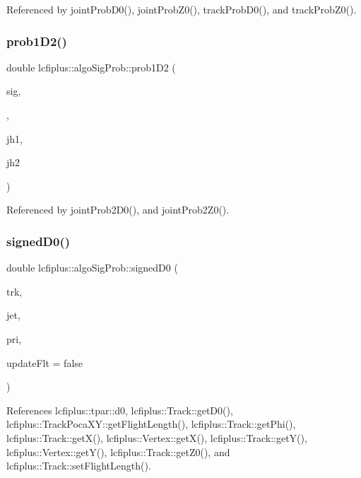 Referenced by joint\+Prob\+D0(), joint\+Prob\+Z0(), track\+Prob\+D0(), and track\+Prob\+Z0().

\mbox{\label{namespacelcfiplus_1_1algoSigProb_a607d8c6a50bd4e79540d9af10041b870}} 
\subsubsection{prob1\+D2()}
{\footnotesize\ttfamily double lcfiplus\+::algo\+Sig\+Prob\+::prob1\+D2 (\begin{DoxyParamCaption}\item[{double}]{sig,  }\item[{double}]{,  }\item[{const T\+H1 $\ast$}]{jh1,  }\item[{const T\+H1 $\ast$}]{jh2 }\end{DoxyParamCaption})}



Referenced by joint\+Prob2\+D0(), and joint\+Prob2\+Z0().

\mbox{\label{namespacelcfiplus_1_1algoSigProb_a69330faef3e18bdd94f5022a49526437}} 
\subsubsection{signed\+D0()}
{\footnotesize\ttfamily double lcfiplus\+::algo\+Sig\+Prob\+::signed\+D0 (\begin{DoxyParamCaption}\item[{const \textbf{ Track} $\ast$}]{trk,  }\item[{const \textbf{ Jet} $\ast$}]{jet,  }\item[{const \textbf{ Vertex} $\ast$}]{pri,  }\item[{bool}]{update\+Flt = {\ttfamily false} }\end{DoxyParamCaption})}



References lcfiplus\+::tpar\+::d0, lcfiplus\+::\+Track\+::get\+D0(), lcfiplus\+::\+Track\+Poca\+X\+Y\+::get\+Flight\+Length(), lcfiplus\+::\+Track\+::get\+Phi(), lcfiplus\+::\+Track\+::get\+X(), lcfiplus\+::\+Vertex\+::get\+X(), lcfiplus\+::\+Track\+::get\+Y(), lcfiplus\+::\+Vertex\+::get\+Y(), lcfiplus\+::\+Track\+::get\+Z0(), and lcfiplus\+::\+Track\+::set\+Flight\+Length().



